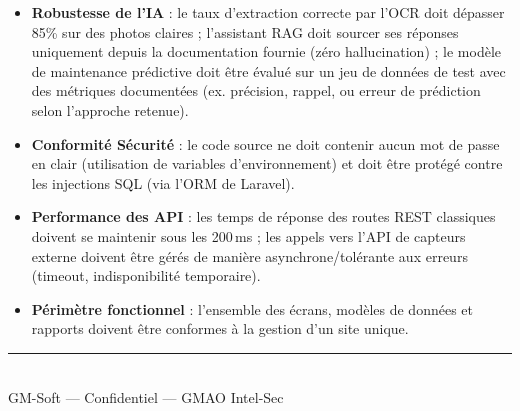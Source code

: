 \documentclass[11pt,a4paper]{article}
\begin{document}
\begin{itemize}
  \item \textbf{Robustesse de l'IA} : le taux d'extraction correcte par l'OCR doit dépasser 85\% sur des photos claires ; l'assistant RAG doit sourcer ses réponses uniquement depuis la documentation fournie (zéro hallucination) ; le modèle de maintenance prédictive doit être évalué sur un jeu de données de test avec des métriques documentées (ex. précision, rappel, ou erreur de prédiction selon l'approche retenue).
  \item \textbf{Conformité Sécurité} : le code source ne doit contenir aucun mot de passe en clair (utilisation de variables d'environnement) et doit être protégé contre les injections SQL (via l'ORM de Laravel).
  \item \textbf{Performance des API} : les temps de réponse des routes REST classiques doivent se maintenir sous les 200\,ms ; les appels vers l'API de capteurs externe doivent être gérés de manière asynchrone/tolérante aux erreurs (timeout, indisponibilité temporaire).
  \item \textbf{Périmètre fonctionnel} : l'ensemble des écrans, modèles de données et rapports doivent être conformes à la gestion d'un site unique.
\end{itemize}

\vspace{1cm}
\begin{center}
\textcolor{midgray}{\rule{0.5\linewidth}{0.4pt}}\\[0.3cm]
{\small \textcolor{midgray}{GM-Soft — Confidentiel — GMAO Intel-Sec}}
\end{center}
\end{document}
